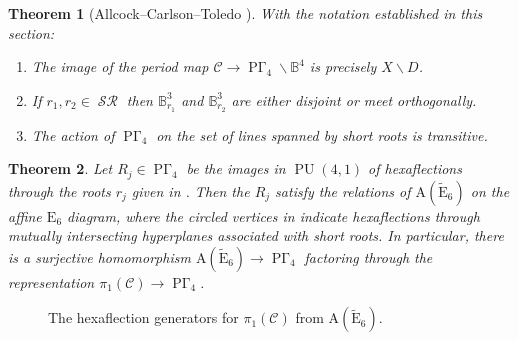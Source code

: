 \documentclass[10pt,a4paper]{amsart}
\newtheorem{thm}{Theorem}
\DeclareMathOperator{\PGam}{\mathrm{P}\Gamma}
\DeclareMathOperator{\PU}{PU}
\DeclareMathOperator{\SR}{\mathcal{SR}}
\newcommand{\bbB}{\mathbb{B}}
\newcommand{\bs}{\backslash}
\newcommand{\calC}{\mathcal{C}}
\newcommand{\ssm}{\smallsetminus}
\begin{document}
\begin{thm}[Allcock--Carlson--Toledo \cite{ACT}]\label{thm:ACTbig}
With the notation established in this section:
\begin{enumerate}

	\item The image of the period map $\calC \to \PGam_4 \bs \bbB^4$ is precisely $X \ssm D$.

	\item If $r_1, r_2 \in \SR$ then $\bbB^3_{r_1}$ and $\bbB^3_{r_2}$ are either disjoint or meet orthogonally.

	\item The action of $\PGam_4$ on the set of lines spanned by short roots is transitive.

\end{enumerate}
\end{thm}

\begin{thm}\label{thm:ACTgensE6}
Let $R_j \in \PGam_4$ be the images in $\PU(4,1)$ of hexaflections through the roots $r_j$ given in \cite[\S 7]{ACT}. Then the $R_j$ satisfy the relations of $\mathrm{A}(\widetilde{\mathrm{E}}_6)$ on the affine $\mathrm{E}_6$ diagram, where the circled vertices in  indicate hexaflections through mutually intersecting hyperplanes associated with short roots. In particular, there is a surjective homomorphism $\mathrm{A}(\widetilde{\mathrm{E}}_6)\to \PGam_4$ factoring through the representation $\pi_1(\calC) \to \PGam_4$.
\end{thm}

\begin{figure}[h]
\centering
{}
\caption{The hexaflection generators for $\pi_1(\calC)$ from $\mathrm{A}(\widetilde{\mathrm{E}}_6)$.}\label{fig:ArtinGens}
\end{figure}
\end{document}
